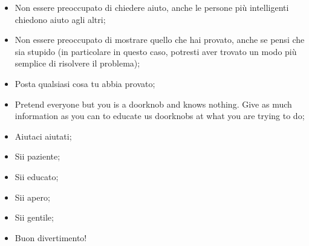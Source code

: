 \begin{itemize}
	\item Non essere preoccupato di chiedere aiuto, anche le persone più intelligenti chiedono aiuto agli altri;
	\item Non essere preoccupato di mostrare quello che hai provato, anche se pensi che sia stupido (in particolare in questo caso, potresti aver trovato un modo più semplice di risolvere il problema);
	\item Posta qualsiasi cosa tu abbia provato;
	\item Pretend everyone but you is a doorknob and knows nothing. Give as much information as you can to educate us doorknobs at what you are trying to do;
	\item Aiutaci aiutati;
	\item Sii paziente;
	\item Sii educato;
	\item Sii apero;
	\item Sii gentile;
	\item Buon divertimento!
\end{itemize}
